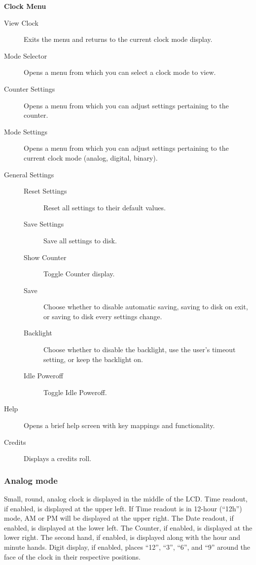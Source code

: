 \textbf{Clock Menu}
\begin{description}
\item[View Clock] Exits the menu and returns to the current clock mode display.
\item[Mode Selector] Opens a menu from which you can select a clock mode to view.
\item[Counter Settings] Opens a menu from which you can adjust settings
    pertaining to the counter.
\item[Mode Settings] Opens a menu from which you can adjust settings pertaining to
    the current clock mode (analog, digital, binary).
\item[General Settings]
    \begin{description}
    \item[Reset Settings]
    Reset all settings to their default values.
    \item[Save Settings]
    Save all settings to disk.
    \item[Show Counter]
    Toggle Counter display.
    \item[Save]
    Choose whether to disable automatic saving, saving to disk on exit, or 
    saving to disk every settings change.
    \item[Backlight]
    Choose whether to disable the backlight, use the user's timeout setting,
    or keep the backlight on.
    \item[Idle Poweroff]
    Toggle Idle Poweroff.
    \end{description}
\item[Help] Opens a brief help screen with key mappings and functionality.
\item[Credits] Displays a credits roll.
\end{description}

\subsubsection{Analog mode}
Small, round, analog clock is displayed in the middle of the LCD.
Time readout, if enabled, is displayed at the upper left.
If Time readout is in 12-hour (``12h'') mode, AM or PM will be displayed at the
upper right.  The Date readout, if enabled, is displayed at the lower left.
The Counter, if enabled, is displayed at the lower right.
The second hand, if enabled, is displayed along with the hour and minute hands.
Digit display, if enabled, places ``12'', ``3'', ``6'', and ``9'' around the
face of the clock in their respective positions. 


